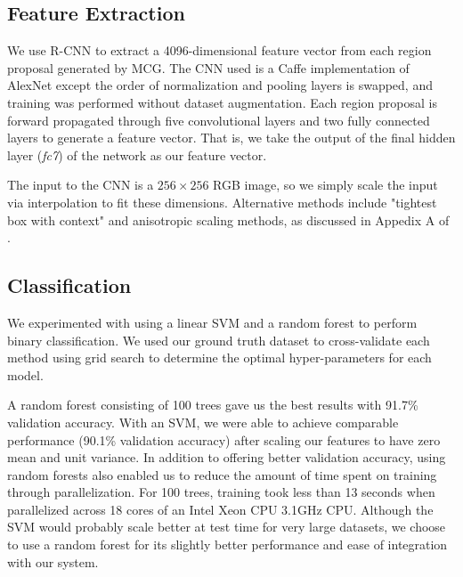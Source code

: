 \documentclass[10pt,twocolumn,letterpaper]{article}
\begin{document}
\subsection{Feature Extraction}

We use R-CNN to extract a 4096-dimensional feature vector from each region proposal generated by MCG. The CNN used is a Caffe implementation of AlexNet \cite{alexnet} except the order of normalization and pooling layers is swapped, and training was performed without dataset augmentation. Each region proposal is forward propagated through five convolutional layers and two fully connected layers to generate a feature vector. That is, we take the output of the final hidden layer (\textit{fc7}) of the network as our feature vector.

The input to the CNN is a $256\times256$ RGB image, so we simply scale the input via interpolation to fit these dimensions. Alternative methods include "tightest box with context" and anisotropic scaling methods, as discussed in Appedix A of \cite{girshick}.

\subsection{Classification}

We experimented with using a linear SVM and a random forest to perform binary classification. We used our ground truth dataset to cross-validate each method using grid search to determine the optimal hyper-parameters for each model.


A random forest consisting of 100 trees gave us the best results with 91.7\% validation accuracy. With an SVM, we were able to achieve comparable performance (90.1\% validation accuracy) after scaling our features to have zero mean and unit variance. In addition to offering better validation accuracy, using random forests also enabled us to reduce the amount of time spent on training through parallelization. For 100 trees, training took less than 13 seconds when parallelized across 18 cores of an Intel Xeon CPU 3.1GHz CPU. Although the SVM would probably scale better at test time for very large datasets, we choose to use a random forest for its slightly better performance and ease of integration with our system.
\end{document}
